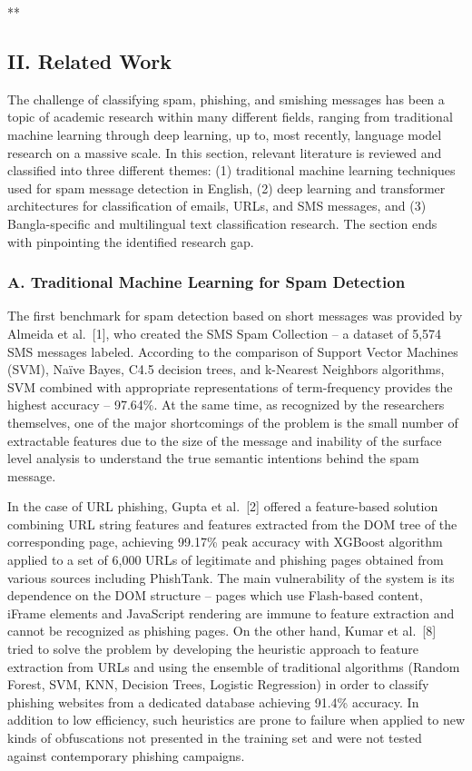 **

\subsection{II. Related Work}\label{ii.-related-work}

The challenge of classifying spam, phishing, and smishing messages has
been a topic of academic research within many different fields, ranging
from traditional machine learning through deep learning, up to, most
recently, language model research on a massive scale. In this section,
relevant literature is reviewed and classified into three different
themes: (1) traditional machine learning techniques used for spam
message detection in English, (2) deep learning and transformer
architectures for classification of emails, URLs, and SMS messages, and
(3) Bangla-specific and multilingual text classification research. The
section ends with pinpointing the identified research gap.

\subsubsection{A. Traditional Machine Learning for Spam
Detection}\label{a.-traditional-machine-learning-for-spam-detection}

The first benchmark for spam detection based on short messages was
provided by Almeida et al.~{[}1{]}, who created the SMS Spam Collection
-- a dataset of 5,574 SMS messages labeled. According to the comparison
of Support Vector Machines (SVM), Naïve Bayes, C4.5 decision trees, and
k-Nearest Neighbors algorithms, SVM combined with appropriate
representations of term-frequency provides the highest accuracy --
97.64\%. At the same time, as recognized by the researchers themselves,
one of the major shortcomings of the problem is the small number of
extractable features due to the size of the message and inability of the
surface level analysis to understand the true semantic intentions behind
the spam message.

In the case of URL phishing, Gupta et al.~{[}2{]} offered a
feature-based solution combining URL string features and features
extracted from the DOM tree of the corresponding page, achieving 99.17\%
peak accuracy with XGBoost algorithm applied to a set of 6,000 URLs of
legitimate and phishing pages obtained from various sources including
PhishTank. The main vulnerability of the system is its dependence on the
DOM structure -- pages which use Flash-based content, iFrame elements
and JavaScript rendering are immune to feature extraction and cannot be
recognized as phishing pages. On the other hand, Kumar et al.~{[}8{]}
tried to solve the problem by developing the heuristic approach to
feature extraction from URLs and using the ensemble of traditional
algorithms (Random Forest, SVM, KNN, Decision Trees, Logistic
Regression) in order to classify phishing websites from a dedicated
database achieving 91.4\% accuracy. In addition to low efficiency, such
heuristics are prone to failure when applied to new kinds of
obfuscations not presented in the training set and were not tested
against contemporary phishing campaigns.

